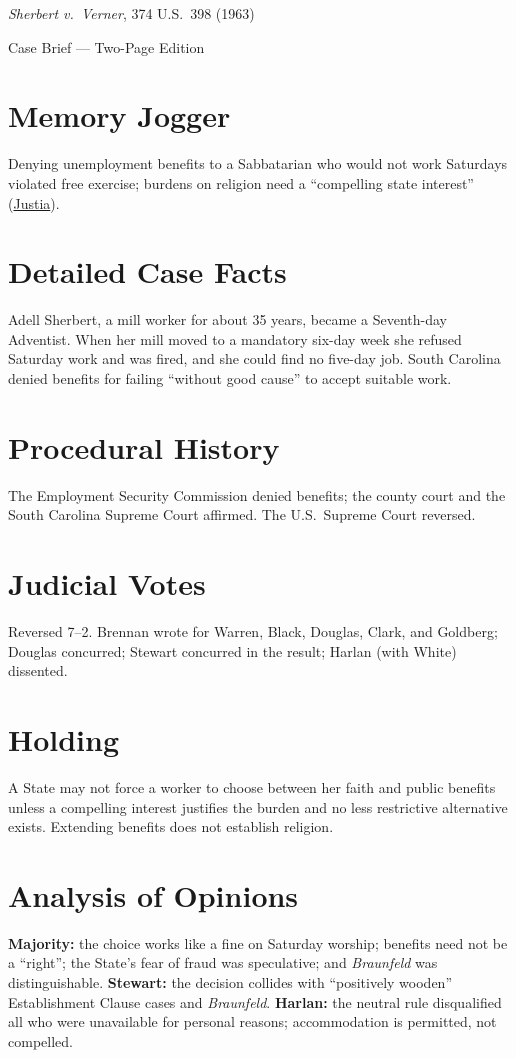 \documentclass[12pt]{article}
\begin{document}
\begin{center}
{\LARGE \textit{Sherbert v.\ Verner}, 374 U.S.\ 398 (1963)\par}
\vspace{0.5em}
{\large Case Brief --- Two-Page Edition\par}
\end{center}

\section{Memory Jogger}
Denying unemployment benefits to a Sabbatarian who would not work Saturdays violated free exercise; burdens on religion need a ``compelling state interest'' (\href{https://supreme.justia.com/cases/federal/us/374/398/}{Justia}).

\section{Detailed Case Facts}
Adell Sherbert, a mill worker for about 35 years, became a Seventh-day Adventist. When her mill moved to a mandatory six-day week she refused Saturday work and was fired, and she could find no five-day job. South Carolina denied benefits for failing ``without good cause'' to accept suitable work.

\section{Procedural History}
The Employment Security Commission denied benefits; the county court and the South Carolina Supreme Court affirmed. The U.S.\ Supreme Court reversed.

\section{Judicial Votes}
Reversed 7--2. Brennan wrote for Warren, Black, Douglas, Clark, and Goldberg; Douglas concurred; Stewart concurred in the result; Harlan (with White) dissented.

\section{Holding}
A State may not force a worker to choose between her faith and public benefits unless a compelling interest justifies the burden and no less restrictive alternative exists. Extending benefits does not establish religion.

\section{Analysis of Opinions}
\textbf{Majority:} the choice works like a fine on Saturday worship; benefits need not be a ``right''; the State's fear of fraud was speculative; and \textit{Braunfeld} was distinguishable. \textbf{Stewart:} the decision collides with ``positively wooden'' Establishment Clause cases and \textit{Braunfeld}. \textbf{Harlan:} the neutral rule disqualified all who were unavailable for personal reasons; accommodation is permitted, not compelled.
\end{document}
